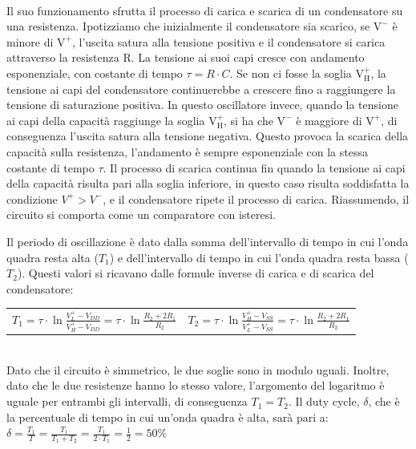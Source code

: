 \documentclass{report}
\begin{document}
\\Il suo funzionamento sfrutta il processo di carica e scarica di un condensatore su una resistenza. Ipotizziamo che inizialmente il condensatore sia scarico, se $\mathrm{V^-}$ è minore di $\mathrm{V^+}$, l'uscita satura alla tensione positiva e il condensatore si carica attraverso la resistenza $\mathrm{R}$. La tensione ai suoi capi cresce con andamento esponenziale, con costante di tempo $\displaystyle{\tau=R\cdot C}$. Se non ci fosse la soglia $\mathrm{V_H^+}$, la tensione ai capi del condensatore continuerebbe a crescere fino a raggiungere la tensione di saturazione positiva. In questo oscillatore invece, quando la tensione ai capi della capacità raggiunge la soglia $\mathrm{V_H^+}$, si ha che $\mathrm{V^-}$ è maggiore di $\mathrm{V^+}$, di conseguenza l'uscita satura alla tensione negativa. Questo provoca la scarica della capacità sulla resistenza, l'andamento è sempre esponenziale con la stessa costante di tempo $\tau$. Il processo di scarica continua fin quando la tensione ai capi della capacità risulta pari alla soglia inferiore, in questo caso risulta soddisfatta la condizione $V^+>V^-$, e il condensatore ripete il processo di carica. Riassumendo, il circuito si comporta come un comparatore con isteresi.\par
Il periodo di oscillazione è dato dalla somma dell'intervallo di tempo in cui l'onda quadra resta alta ($T_1$) e dell'intervallo di tempo in cui l'onda quadra resta bassa ($T_2$). Questi valori si ricavano dalle formule inverse di carica e di scarica del condensatore:
\begin{table}[h!]
	\centering
	\begin{tabular}{cc}
		$\displaystyle{T_1=\tau\cdot\ln\frac{V_L^+-V_{DD}}{V_H^+-V_{DD}}=\tau\cdot\ln\frac{R_2+2R_1}{R_2}}$\;\;\;\;\;\;\;\;\;\;\;\;\; & $\displaystyle{T_2=\tau\cdot\ln\frac{V_H^+-V_{SS}}{V_L^+-V_{SS}}=\tau\cdot\ln\frac{R_2+2R_1}{R_2}}$\\ 
	\end{tabular}
	\label{table:formuleSoglie}
\end{table}
\\Dato che il circuito è simmetrico, le due soglie sono in modulo uguali. Inoltre, dato che le due resistenze hanno lo stesso valore, l'argomento del logaritmo è uguale per entrambi gli intervalli, di conseguenza $T_1=T_2$. Il duty cycle, $\delta$, che è la percentuale di tempo in cui un'onda quadra è alta, sarà pari a:
\\[4pt]\indent$\displaystyle{\delta=\frac{T_1}{T}=\frac{T_1}{T_1+T_2}=\frac{T_1}{2\cdot T_1}=\frac{1}{2}=50\%}$
\end{document}

